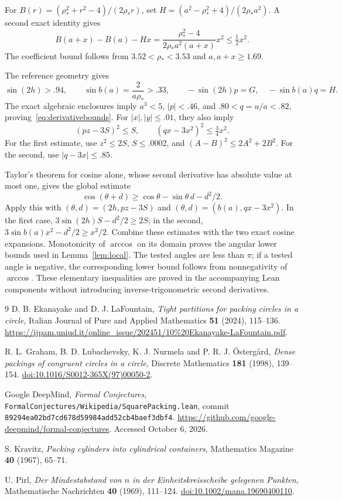 \documentclass[11pt]{amsart}
\theoremstyle{definition}
\theoremstyle{remark}
\numberwithin{equation}{section}
\newcommand{\rhoopt}{\rho_*}
\begin{document}
For $B(r)=(\rhoopt^2+r^2-4)/(2\rhoopt r)$, set
$H=(a^2-\rhoopt^2+4)/(2\rhoopt a^2)$. A second exact identity gives
\[
 B(a+x)-B(a)-Hx
 =\frac{\rhoopt^2-4}{2\rhoopt a^2(a+x)}x^2\leq\tfrac12x^2.
\]
The coefficient bound follows from $3.52<\rhoopt<3.53$ and
$a,a+x\geq1.69$.

The reference geometry gives
\[
 \sin(2h)>.94,\qquad \sin b(a)=\frac2{a\rhoopt}>.33,
 \qquad -\sin(2h)p=G,\quad -\sin b(a)q=H.
\]
The exact algebraic enclosures imply $a^3<5$, $|p|<.46$, and
$.80<q=u/a<.82$, proving~\eqref{eq:derivativebounds}.
For $|x|,|y|\leq.01$, they also imply
\[
 (pz-3S)^2\leq S,\qquad (qx-3x^2)^2\leq\tfrac34x^2.
\]
For the first estimate, use $z^2\leq2S$, $S\leq.0002$, and
$(A-B)^2\leq2A^2+2B^2$. For the second, use
$|q-3x|\leq.85$.

Taylor's theorem for cosine alone, whose second derivative has absolute
value at most one, gives the global estimate
\[
 \cos(\theta+d)\geq\cos\theta-\sin\theta\,d-d^2/2.
\]
Apply this with $(\theta,d)=(2h,pz-3S)$ and
$(\theta,d)=(b(a),qx-3x^2)$. In the first case,
$3\sin(2h)S-d^2/2\geq2S$; in the second,
$3\sin b(a)x^2-d^2/2\geq x^2/2$. Combine these estimates with the
two exact cosine expansions. Monotonicity of $\arccos$ on its domain
proves the angular lower bounds used in Lemma~\ref{lem:local}.
The tested angles are less than $\pi$; if a tested angle is negative,
the corresponding lower bound follows from nonnegativity of $\arccos$.
These elementary inequalities are proved in the accompanying Lean
components without introducing inverse-trigonometric second derivatives.

\begin{thebibliography}{9}
D. B. Ekanayake and D. J. LaFountain,
\emph{Tight partitions for packing circles in a circle},
Italian Journal of Pure and Applied Mathematics \textbf{51} (2024), 115--136.
\url{https://ijpam.uniud.it/online_issue/202451/10%20Ekanayake-LaFountain.pdf}.

R. L. Graham, B. D. Lubachevsky, K. J. Nurmela and P. R. J. \"Osterg\aa rd,
\emph{Dense packings of congruent circles in a circle},
Discrete Mathematics \textbf{181} (1998), 139--154.
\href{https://doi.org/10.1016/S0012-365X(97)00050-2}{doi:10.1016/S0012-365X(97)00050-2}.

Google DeepMind, \emph{Formal Conjectures},
\texttt{FormalConjectures/Wikipedia/SquarePacking.lean},
commit \texttt{89294ea02bd7cd678d59984add52cb4baef3dbf4}.
\url{https://github.com/google-deepmind/formal-conjectures}.
Accessed October 6, 2026.

S. Kravitz, \emph{Packing cylinders into cylindrical containers},
Mathematics Magazine \textbf{40} (1967), 65--71.

U. Pirl, \emph{Der Mindestabstand von $n$ in der Einheitskreisscheibe
gelegenen Punkten}, Mathematische Nachrichten \textbf{40} (1969), 111--124.
\href{https://doi.org/10.1002/mana.19690400110}{doi:10.1002/mana.19690400110}.
\end{thebibliography}
\end{document}
